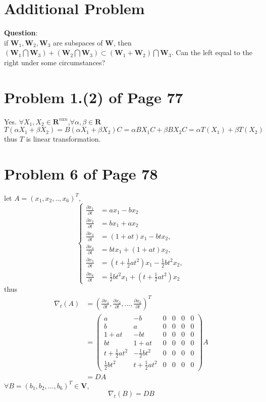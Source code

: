 \documentclass[12pt,a4paper]{article}
\newcommand{\mysection}[2]{
\section{Problem #1 of Page #2}	
	}
\begin{document}
\section{Additional Problem}
\textbf{Question}: \\
if $\mathbf{W}_1,\mathbf{W}_2,\mathbf{W}_3$ are subspaces of $\mathbf{W}$, then 
$(\mathbf{W}_1 \bigcap \mathbf{W}_3) + (\mathbf{W}_2 \bigcap \mathbf{W}_3) \subset (\mathbf{W}_1 +\mathbf{W}_2) \bigcap \mathbf{W}_3$.
Can the left equal to the right under some circumstances?
 


\mysection{1.(2)}{77}
Yes. $\forall X_1 ,X_2 \in \mathbf{R}^{n\text{x}n}$,$\forall 
\alpha,\beta \in \mathbf{R}
$\\
\[T(\alpha X_1 + \beta X_2) = B(\alpha X_1 + \beta X_2)C = \alpha BX_1C + \beta BX_2C = \alpha T(X_1) + \beta T(X_2) \]
thus $T$ is linear transformation.
\mysection{6}{78}
let $A = (x_1,x_2,..,x_6)^{T}$,
\begin{equation*}
\left\lbrace 
\begin{split}
\frac{\partial x_1}{\partial t} &= ax_1-bx_2 \\
\frac{\partial x_2}{\partial t} &= bx_1+ax_2\\
\frac{\partial x_3}{\partial t} &=(1+at)x_1 - btx_2, \\
\frac{\partial x_4}{\partial t}&=btx_1 + (1+at)x_2,\\
\frac{\partial x_5}{\partial t}&=(t+\frac{1}{2}at^{2})x_1
- \frac{1}{2}bt^{2}x_2,\\
\frac{\partial x_6}{\partial t}&= \frac{1}{2}bt^{2}x_1 + (t+\frac{1}{2}at^{2})x_2
\end{split}
\right .
\end{equation*}
thus 
\begin{equation*}
\begin{split}
\nabla_t(A) &= (\frac{\partial x_1}{\partial t},\frac{\partial x_2}{\partial t},...,\frac{\partial x_6}{\partial t})^{T} \\
&= \left(
\begin{array}{cccccc}
a & -b & 0 & 0 & 0 &0 \\
b & a & 0 &0 &0&0\\
1+at&-bt&0&0&0&0\\
bt&1+at&0&0&0&0 \\
t+\frac{1}{2}at^{2}&-\frac{1}{2}bt^{2}&0&0&0&0 \\
\frac{1}{2}bt^{2}&t+\frac{1}{2}at^{2}&0&0&0&0
\end{array}
\right)A \\
&= D A
\end{split}
\end{equation*}
$\forall B = (b_1, b_2 , ...
,b_6)^{T} \in \mathbf{V}$,
\[
\nabla_t(B) = D B
\]
\end{document}
